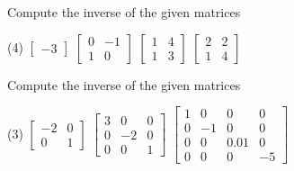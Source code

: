 \begin{exercise}
Compute the inverse of the given matrices
\begin{tasks}(4)
\task
$\begin{bmatrix}
-3
\end{bmatrix}$
\task
$\begin{bmatrix}
0 & -1 \\
1 & 0
\end{bmatrix}$
\task
$\begin{bmatrix}
1 & 4 \\
1 & 3
\end{bmatrix}$
\task
$\begin{bmatrix}
2 & 2 \\
1 & 4
\end{bmatrix}$
\end{tasks}
\end{exercise}

\begin{exercise}
Compute the inverse of the given matrices
\begin{tasks}(3)
\task
$\begin{bmatrix}
-2 & 0 \\
0 & 1 
\end{bmatrix}$
\task
$\begin{bmatrix}
3 & 0 & 0 \\
0 & -2 & 0 \\ 
0 & 0 & 1
\end{bmatrix}$
\task
$\begin{bmatrix}
1 & 0 & 0 & 0 \\
0 & -1 & 0 & 0 \\ 
0 & 0 & 0.01 & 0 \\
0 & 0 & 0 & -5
\end{bmatrix}$
\end{tasks}
\end{exercise}

\setcounter{exercise}{100}

